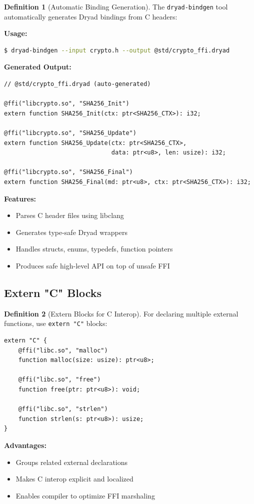 \documentclass[12pt,a4paper]{article}
\theoremstyle{definition}
\newtheorem{definition}{Definition}[section]
\begin{document}
\begin{definition}[Automatic Binding Generation]
The \texttt{dryad-bindgen} tool automatically generates Dryad bindings from C headers:

\textbf{Usage:}
\begin{lstlisting}[language=bash]
$ dryad-bindgen --input crypto.h --output @std/crypto_ffi.dryad
\end{lstlisting}

\textbf{Generated Output:}
\begin{lstlisting}[language=Dryad]
// @std/crypto_ffi.dryad (auto-generated)

@ffi("libcrypto.so", "SHA256_Init")
extern function SHA256_Init(ctx: ptr<SHA256_CTX>): i32;

@ffi("libcrypto.so", "SHA256_Update")
extern function SHA256_Update(ctx: ptr<SHA256_CTX>, 
                              data: ptr<u8>, len: usize): i32;

@ffi("libcrypto.so", "SHA256_Final")
extern function SHA256_Final(md: ptr<u8>, ctx: ptr<SHA256_CTX>): i32;
\end{lstlisting}

\textbf{Features:}
\begin{itemize}[leftmargin=*]
    \item Parses C header files using libclang
    \item Generates type-safe Dryad wrappers
    \item Handles structs, enums, typedefs, function pointers
    \item Produces safe high-level API on top of unsafe FFI
\end{itemize}
\end{definition}

\subsection{Extern "C" Blocks}

\begin{definition}[Extern Blocks for C Interop]
For declaring multiple external functions, use \texttt{extern "C"} blocks:

\begin{lstlisting}[language=Dryad]
extern "C" {
    @ffi("libc.so", "malloc")
    function malloc(size: usize): ptr<u8>;
    
    @ffi("libc.so", "free")
    function free(ptr: ptr<u8>): void;
    
    @ffi("libc.so", "strlen")
    function strlen(s: ptr<u8>): usize;
}
\end{lstlisting}

\textbf{Advantages:}
\begin{itemize}[leftmargin=*]
    \item Groups related external declarations
    \item Makes C interop explicit and localized
    \item Enables compiler to optimize FFI marshaling
\end{itemize}
\end{definition}
\end{document}
